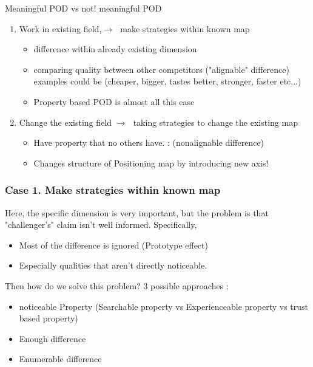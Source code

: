 \documentclass[12pt]{article}
\newcommand{\ra}{$\rightarrow \text{ }$}
\begin{document}
\begin{center}
	Meaningful POD vs not! meaningful POD

\end{center}
\begin{enumerate}
	\item Work in existing field,\ra make strategies within known map
	\begin{itemize}
		\item difference within already existing dimension
		\item comparing quality between other competitors ("alignable" difference)
		examples could be (cheaper, bigger, tastes better, stronger, faster etc...)
		\item Property based POD is almost all this case
	\end{itemize}
	\item Change the existing field \ra taking strategies to change the existing map
	\begin{itemize}
		\item Have property that no others have. : (nonalignable difference)
		\item Changes structure of Positioning map by introducing new axis!
	\end{itemize}
\end{enumerate}
\subsubsection{Case 1. Make strategies within known map}
Here, the specific dimension is very important, but the problem is that "challenger's" claim isn't well informed. Specifically,
\begin{itemize}
	\item Most of the difference is ignored (Prototype effect)
	\item Especially qualities that aren't directly noticeable.
\end{itemize}
Then how do we solve this problem? 3 possible approaches :
\begin{itemize}
	\item noticeable Property (Searchable property vs Experienceable property vs trust based property)
	\item Enough difference
	\item Enumerable difference
\end{itemize}
\end{document}
